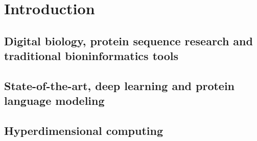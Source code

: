  \chapter[Introduction]%
{Introduction}

\section{Digital biology, protein sequence research and traditional bioninformatics tools}

\section{State-of-the-art, deep learning and protein language modeling}

\section{Hyperdimensional computing}



